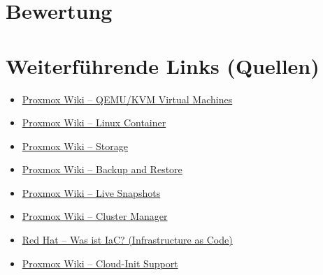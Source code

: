 \documentclass[a4paper,10pt,addpoints]{exam}
\begin{document}
\section*{Bewertung}
  
 \cellwidth{2.2em}
\begin{center}
  \gradetable[h][questions]
\end{center}

\section*{Weiterführende Links (Quellen)}
\begin{itemize}
  \item \href{https://pve.proxmox.com/wiki/Qemu/KVM_Virtual_Machines}{Proxmox Wiki -- QEMU/KVM Virtual Machines}
  \item \href{https://pve.proxmox.com/wiki/Linux_Container}{Proxmox Wiki -- Linux Container}
  \item \href{https://pve.proxmox.com/wiki/Storage}{Proxmox Wiki -- Storage}
  \item \href{https://pve.proxmox.com/wiki/Backup_and_Restore}{Proxmox Wiki -- Backup and Restore}
  \item \href{https://pve.proxmox.com/wiki/Live_Snapshots}{Proxmox Wiki -- Live Snapshots}
  \item \href{https://pve.proxmox.com/wiki/Cluster_Manager}{Proxmox Wiki -- Cluster Manager}
  \item \href{https://www.redhat.com/de/topics/automation/what-is-infrastructure-as-code-iac}{Red Hat -- Was ist IaC? (Infrastructure as Code)}
  \item \href{https://pve.proxmox.com/wiki/Cloud-Init_Support}{Proxmox Wiki -- Cloud-Init Support}
\end{itemize}
\end{document}
